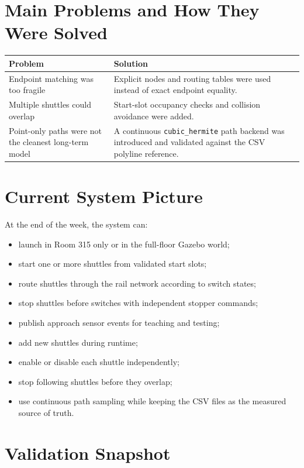 \documentclass[11pt,a4paper]{article}
\begin{document}
\section*{Main Problems and How They Were Solved}

\begin{tabularx}{\textwidth}{>{\raggedright\arraybackslash}p{3.3cm} X}
\toprule
\textbf{Problem} & \textbf{Solution} \\
\midrule
Endpoint matching was too fragile & Explicit nodes and routing tables were used
instead of exact endpoint equality. \\
\midrule

Multiple shuttles could overlap & Start-slot occupancy checks and collision
avoidance were added. \\
\midrule

Point-only paths were not the cleanest long-term model & A continuous
\texttt{cubic\_hermite} path backend was introduced and validated against the
CSV polyline reference. \\
\bottomrule
\end{tabularx}

\section*{Current System Picture}

At the end of the week, the system can:

\begin{itemize}
\item launch in Room 315 only or in the full-floor Gazebo world;
\item start one or more shuttles from validated start slots;
\item route shuttles through the rail network according to switch states;
\item stop shuttles before switches with independent stopper commands;
\item publish approach sensor events for teaching and testing;
\item add new shuttles during runtime;
\item enable or disable each shuttle independently;
\item stop following shuttles before they overlap;
\item use continuous path sampling while keeping the CSV files as the measured
source of truth.
\end{itemize}

\section*{Validation Snapshot}
\end{document}

